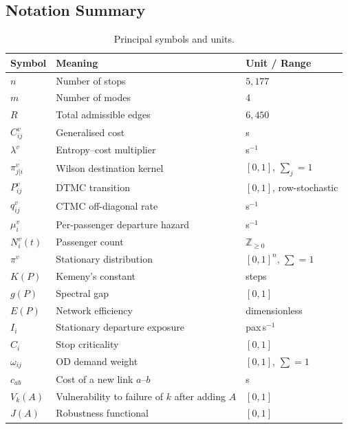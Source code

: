\documentclass[12pt,a4paper]{article}
\theoremstyle{plain}
\theoremstyle{definition}
\theoremstyle{remark}
\begin{document}
\subsection*{Notation Summary}

\begin{table}[htbp]
\centering
\small
\begin{tabular}{lll}
\toprule
Symbol & Meaning & Unit / Range \\
\midrule
$n$          & Number of stops               & $5{,}177$ \\
$m$          & Number of modes               & 4 \\
$R$          & Total admissible edges        & $6{,}450$ \\
$C^v_{ij}$   & Generalised cost              & s \\
$\lambda^v$  & Entropy--cost multiplier      & s$^{-1}$ \\
$\pi^v_{j|i}$& Wilson destination kernel     & $[0,1]$, $\sum_j=1$ \\
$P^v_{ij}$   & DTMC transition               & $[0,1]$, row-stochastic \\
$q^v_{ij}$   & CTMC off-diagonal rate        & s$^{-1}$ \\
$\mu^v_i$    & Per-passenger departure hazard& s$^{-1}$ \\
$N^v_i(t)$   & Passenger count               & $\mathbb{Z}_{\ge0}$ \\
$\pi^v$      & Stationary distribution       & $[0,1]^n$, $\sum=1$ \\
$K(P)$       & Kemeny's constant             & steps \\
$g(P)$       & Spectral gap                  & $[0,1]$ \\
$E(P)$       & Network efficiency            & dimensionless \\
$I_i$        & Stationary departure exposure & pax\,s$^{-1}$ \\
$C_i$        & Stop criticality              & $[0,1]$ \\
$\omega_{ij}$& OD demand weight              & $[0,1]$, $\sum=1$ \\
$c_{ab}$     & Cost of a new link $a$--$b$   & s \\
$V_k(A)$     & Vulnerability to failure of $k$ after adding $A$ & $[0,1]$ \\
$J(A)$       & Robustness functional         & $[0,1]$ \\
\bottomrule
\end{tabular}
\caption{Principal symbols and units.}
\end{table}
\end{document}
